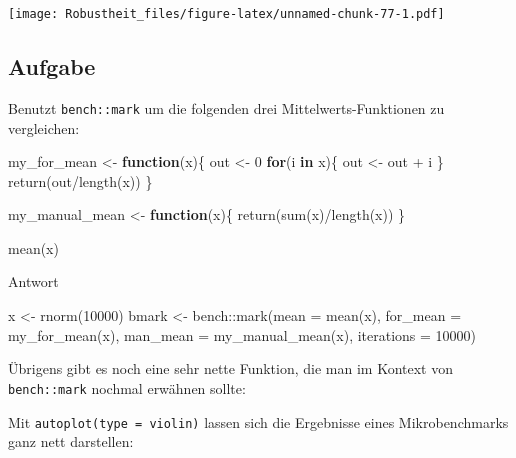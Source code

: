 \documentclass[
]{book}
\newenvironment{Shaded}{\begin{snugshade}}{\end{snugshade}}
\newcommand{\AttributeTok}[1]{\textcolor[rgb]{0.77,0.63,0.00}{#1}}
\newcommand{\ControlFlowTok}[1]{\textcolor[rgb]{0.13,0.29,0.53}{\textbf{#1}}}
\newcommand{\DecValTok}[1]{\textcolor[rgb]{0.00,0.00,0.81}{#1}}
\newcommand{\FunctionTok}[1]{\textcolor[rgb]{0.00,0.00,0.00}{#1}}
\newcommand{\NormalTok}[1]{#1}
\newcommand{\OtherTok}[1]{\textcolor[rgb]{0.56,0.35,0.01}{#1}}
\newcommand{\SpecialCharTok}[1]{\textcolor[rgb]{0.00,0.00,0.00}{#1}}
\begin{document}
\texttt{[image: Robustheit\_files/figure-latex/unnamed-chunk-77-1.pdf]}

\hypertarget{aufgabe-10}{%
\subsection{Aufgabe}\label{aufgabe-10}}

Benutzt \texttt{bench::mark} um die folgenden drei Mittelwerts-Funktionen zu vergleichen:

\begin{Shaded}
\begin{Highlighting}[]
\NormalTok{my\_for\_mean }\OtherTok{\textless{}{-}} \ControlFlowTok{function}\NormalTok{(x)\{}
\NormalTok{  out }\OtherTok{\textless{}{-}} \DecValTok{0}
  \ControlFlowTok{for}\NormalTok{(i }\ControlFlowTok{in}\NormalTok{ x)\{}
\NormalTok{    out }\OtherTok{\textless{}{-}}\NormalTok{ out }\SpecialCharTok{+}\NormalTok{ i}
\NormalTok{  \}}
  \FunctionTok{return}\NormalTok{(out}\SpecialCharTok{/}\FunctionTok{length}\NormalTok{(x))}
\NormalTok{\}}

\NormalTok{my\_manual\_mean }\OtherTok{\textless{}{-}} \ControlFlowTok{function}\NormalTok{(x)\{}
  \FunctionTok{return}\NormalTok{(}\FunctionTok{sum}\NormalTok{(x)}\SpecialCharTok{/}\FunctionTok{length}\NormalTok{(x))}
\NormalTok{\}}

\FunctionTok{mean}\NormalTok{(x)}
\end{Highlighting}
\end{Shaded}

Antwort

\begin{Shaded}
\begin{Highlighting}[]
\NormalTok{x }\OtherTok{\textless{}{-}} \FunctionTok{rnorm}\NormalTok{(}\DecValTok{10000}\NormalTok{)}
\NormalTok{bmark }\OtherTok{\textless{}{-}}\NormalTok{ bench}\SpecialCharTok{::}\FunctionTok{mark}\NormalTok{(}\AttributeTok{mean =} \FunctionTok{mean}\NormalTok{(x),}
             \AttributeTok{for\_mean =} \FunctionTok{my\_for\_mean}\NormalTok{(x),}
             \AttributeTok{man\_mean =} \FunctionTok{my\_manual\_mean}\NormalTok{(x),}
            \AttributeTok{iterations =} \DecValTok{10000}\NormalTok{)}
\end{Highlighting}
\end{Shaded}

Übrigens gibt es noch eine sehr nette Funktion, die man im Kontext von \texttt{bench::mark} nochmal erwähnen sollte:

Mit \texttt{autoplot(type\ =\ \textquotesingle{}violin\textquotesingle{})} lassen sich die Ergebnisse eines Mikrobenchmarks ganz nett darstellen:
\end{document}
